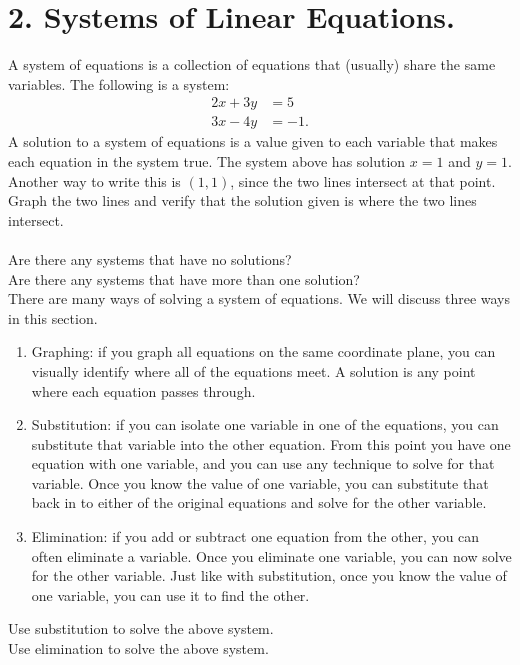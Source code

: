 \documentclass[12pt,fleqn]{book}
\begin{document}
\chapter{2. Systems of Linear Equations.}
A system of equations is a collection of equations that (usually) share the same variables.  The following is a system:
\begin{align*}
	2x+3y & =5  \\
    3x-4y &=-1.
\end{align*}
A solution to a system of equations is a value given to each variable that makes each equation in the system true.  The system above has solution $x=1$ and $y=1$.  Another way to write this is $(1,1)$, since the two lines intersect at that point.
\\[1em]
Graph the two lines and verify that the solution given is where the two lines intersect.
\\[1em]
\\[1em]
Are there any systems that have no solutions?
\\[5em]
Are there any systems that have more than one solution?
\\[5em]
There are many ways of solving a system of equations.  We will discuss three ways in this section.
\begin{enumerate}
	\item Graphing: if you graph all equations on the same coordinate plane, you can visually identify where all of the equations meet.  A solution is any point where each equation passes through.
	\item Substitution: if you can isolate one variable in one of the equations, you can substitute that variable into the other equation.  From this point you have one equation with one variable, and you can use any technique to solve for that variable.  Once you know the value of one variable, you can substitute that back in to either of the original equations and solve for the other variable.
	\item Elimination: if you add or subtract one equation from the other, you can often eliminate a variable.  Once you eliminate one variable, you can now solve for the other variable.  Just like with substitution, once you know the value of one variable, you can use it to find the other.
\end{enumerate}
Use substitution to solve the above system.\\[1in]
Use elimination to solve the above system.\\[1in]
\end{document}
